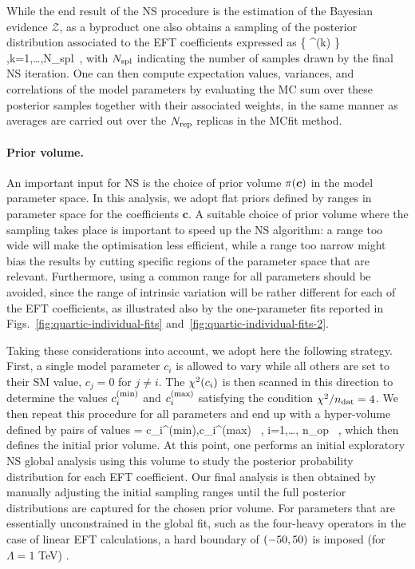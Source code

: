 While the end result of the NS procedure is the estimation of the 
Bayesian evidence $\mathcal{Z}$, as a byproduct one also obtains 
a sampling of the posterior distribution
associated to the EFT coefficients expressed as
\be
\{ ^{(k)} \}\, ,\qquad  k=1,\dots,N_{\rm spl}\, ,
\ee
with $N_{\rm spl}$ indicating the number
of samples drawn by the final NS iteration.
%
One can then compute expectation values, variances, and correlations of the model
parameters by evaluating the MC sum over these posterior samples together 
with their associated weights, in the same
manner as averages are carried out
over the $N_{\rm rep}$ replicas in the MCfit method. 

\paragraph{Prior volume.}
%
An important input for NS is the choice of prior volume $\pi \lp \boldsymbol{c} \rp$
in the model parameter space.
%
In this analysis, we adopt flat priors 
defined by ranges in parameter space for the coefficients $\boldsymbol{c}$.
%
A suitable choice of prior volume where the sampling takes place is important
to speed up the NS algorithm: a range too wide will make the optimisation less
efficient, while a range too narrow might bias the results by cutting 
specific regions of the parameter space that are relevant.
%
Furthermore, using a common range for all parameters should be avoided,
since the range of intrinsic variation will be rather different for each
of the EFT coefficients, as illustrated also by the one-parameter fits
reported in Figs.~\ref{fig:quartic-individual-fits} 
and~\ref{fig:quartic-individual-fits-2}.

Taking these considerations into account, we adopt here the following strategy.
%
First, a single model parameter $c_i$ is allowed to vary
while all others are set to their SM value, $c_j=0$ for $j\ne i$.
%
The $\chi^2 \lp c_i \rp$ is then scanned in this
direction to determine the values $c_i^{\rm (min)}$ and  $c_i^{\rm (max)}$
satisfying the condition $\chi^2/n_{\rm dat}=4$.
%
We then repeat this procedure 
for all parameters and end up with a hyper-volume 
defined by pairs of values
\be
\pi \lp {} \rp = \lc \lp c_i^{\rm (min)},c_i^{\rm (max)} \rp \, ,\quad
i=1,\ldots, n_{\rm op} \rc \, ,
\ee
which then defines the initial prior volume.
%
At this point, one performs an initial exploratory NS global analysis using this
volume to study the posterior probability distribution
for each EFT coefficient.
%
Our final analysis is then obtained by manually adjusting the 
initial sampling ranges until the full posterior distributions are captured for the chosen
prior volume. 
%
For parameters that are essentially unconstrained in the global fit,
such as the four-heavy operators in the case of linear EFT calculations,
a hard boundary of $\lp -50 , 50 \rp$ is imposed (for $\Lambda=1$ TeV) . 

